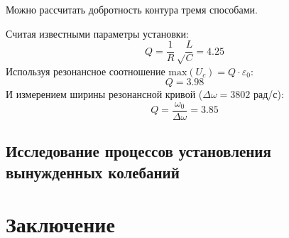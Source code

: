 Можно рассчитать добротность контура тремя способами.

Считая известными параметры установки:
\begin{equation}
	Q=\frac{1}{R}\sqrt\frac{L}{C}=4.25
\end{equation}
Используя резонансное соотношение $\mathrm{max}(U_c)=Q\cdot \varepsilon_0$:
\begin{equation}
	Q=3.98
\end{equation}
И измерением ширины резонансной кривой ($\Delta\omega=3802$ рад/с):
\begin{equation}
	Q=\frac{\omega_0}{\Delta\omega}=3.85
\end{equation}
\subsection{Исследование процессов установления вынужденных колебаний}

\section{Заключение}

 